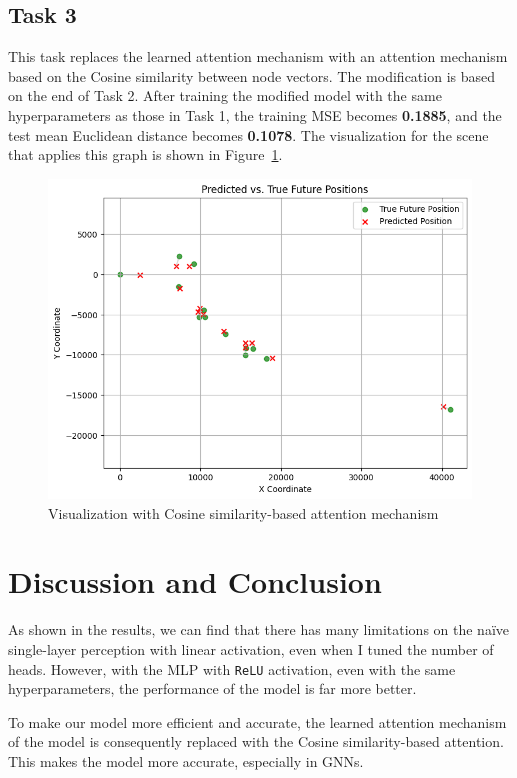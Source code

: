 \documentclass[conference]{IEEEtran}
\begin{document}
\subsection*{Task 3}

This task replaces the learned attention mechanism with an attention mechanism
based on the Cosine similarity between node vectors. The modification is based
on the end of Task 2. After training the modified model with the same
hyperparameters as those in Task 1, the training MSE becomes \textbf{0.1885},
and the test mean Euclidean distance becomes \textbf{0.1078}. The visualization
for the scene that applies this graph is shown in Figure~\ref{fig:visual3}.

\begin{figure}[htbp]
    \centering
    \includegraphics[width=0.8\linewidth]{figvisual3.png}
    \caption{Visualization with Cosine similarity-based attention mechanism}
    \label{fig:visual3}
\end{figure}

\section{Discussion and Conclusion}

As shown in the results, we can find that there has many limitations on the
naïve single-layer perception with linear activation, even when I tuned the
number of heads. However, with the MLP with \texttt{ReLU} activation, even with
the same hyperparameters, the performance of the model is far more better.

To make our model more efficient and accurate, the learned attention mechanism
of the model is consequently replaced with the Cosine similarity-based
attention. This makes the model more accurate, especially in GNNs.
\end{document}
